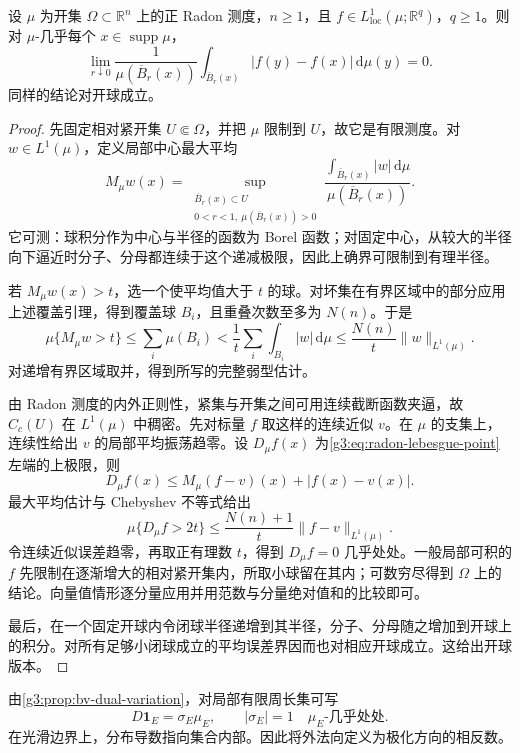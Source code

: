 \begin{lemma}\label{g3:lem:radon-measure-differentiation}
	设 \(\mu\) 为开集 \(\Omega\subset\mathbb R^n\) 上的正 Radon 测度，\(n\ge1\)，且 \(f\in L^1_{\mathrm{loc}}(\mu;\mathbb R^q)\)，\(q\ge1\)。则对 \(\mu\)-几乎每个 \(x\in\operatorname{supp}\mu\)，
	\begin{equation}\label{g3:eq:radon-lebesgue-point}
		\lim_{r\downarrow0}\frac{1}{\mu(\overline B_r(x))}
		\int_{\overline B_r(x)}|f(y)-f(x)|\,\mathrm d\mu(y)=0.
	\end{equation}
	同样的结论对开球成立。
\end{lemma}
\begin{proof}
	先固定相对紧开集 \(U\Subset\Omega\)，并把 \(\mu\) 限制到 \(U\)，故它是有限测度。对 \(w\in L^1(\mu)\)，定义局部中心最大平均
	\[
		M_\mu w(x)=\sup_{\substack{\overline B_r(x)\subset U\\
		0<r<1,\ \mu(\overline B_r(x))>0}}
		\frac{\int_{\overline B_r(x)}|w|\,\mathrm d\mu}
		{\mu(\overline B_r(x))}.
	\]
	它可测：球积分作为中心与半径的函数为 Borel 函数；对固定中心，从较大的半径向下逼近时分子、分母都连续于这个递减极限，因此上确界可限制到有理半径。

	若 \(M_\mu w(x)>t\)，选一个使平均值大于 \(t\) 的球。对坏集在有界区域中的部分应用上述覆盖引理，得到覆盖球 \(B_i\)，且重叠次数至多为 \(N(n)\)。于是
	\[
		\mu\{M_\mu w>t\}
		\le\sum_i\mu(B_i)
		<\frac1t\sum_i\int_{B_i}|w|\,\mathrm d\mu
		\le\frac{N(n)}t\|w\|_{L^1(\mu)}.
	\]
	对递增有界区域取并，得到所写的完整弱型估计。

	由 Radon 测度的内外正则性，紧集与开集之间可用连续截断函数夹逼，故 \(C_c(U)\) 在 \(L^1(\mu)\) 中稠密。先对标量 \(f\) 取这样的连续近似 \(v\)。在 \(\mu\) 的支集上，连续性给出 \(v\) 的局部平均振荡趋零。设 \(D_\mu f(x)\) 为\eqref{g3:eq:radon-lebesgue-point}左端的上极限，则
	\[
		D_\mu f(x)\le M_\mu(f-v)(x)+|f(x)-v(x)|.
	\]
	最大平均估计与 Chebyshev 不等式给出
	\[
		\mu\{D_\mu f>2t\}
		\le \frac{N(n)+1}{t}\|f-v\|_{L^1(\mu)}.
	\]
	令连续近似误差趋零，再取正有理数 \(t\)，得到 \(D_\mu f=0\) 几乎处处。一般局部可积的 \(f\) 先限制在逐渐增大的相对紧开集内，所取小球留在其内；可数穷尽得到 \(\Omega\) 上的结论。向量值情形逐分量应用并用范数与分量绝对值和的比较即可。

	最后，在一个固定开球内令闭球半径递增到其半径，分子、分母随之增加到开球上的积分。对所有足够小闭球成立的平均误差界因而也对相应开球成立。这给出开球版本。
\end{proof}

由\cref{g3:prop:bv-dual-variation}，对局部有限周长集可写
\[
	D\mathbf1_E=\sigma_E\mu_E,\qquad |\sigma_E|=1\quad\mu_E\text{-几乎处处}.
\]
在光滑边界上，分布导数指向集合内部。因此将外法向定义为极化方向的相反数。

